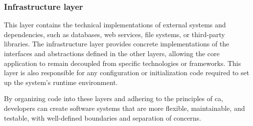 \subsubsection{Infrastructure layer}
This layer contains the technical implementations of external systems and dependencies,
such as databases, web services, file systems, or third-party libraries. The
infrastructure layer provides concrete implementations of the interfaces and abstractions
defined in the other layers, allowing the core application to remain decoupled from
specific technologies or frameworks. This layer is also responsible for any configuration
or initialization code required to set up the system's runtime environment.

By organizing code into these layers and adhering to the principles of \gls{ca},
developers can create software systems that are more flexible, maintainable, and testable,
with well-defined boundaries and separation of concerns.
